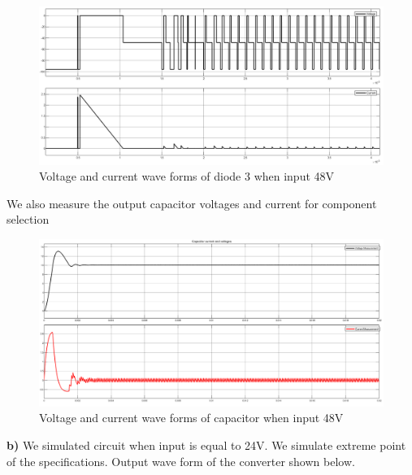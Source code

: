 \documentclass{article}
\newcommand\tab[1][1cm]{\hspace*{#1}}
\begin{document}
\begin{figure}[H]
    \centering
    \includegraphics[scale=0.3]{48diode3.png}
    \caption{Voltage and current wave forms of diode 3 when input 48V}
    \label{fig:my_label}
\end{figure}
\tab We also measure the output capacitor voltages and current for component selection
\begin{figure}[H]
    \centering
    \includegraphics[scale=0.3]{capacitor48.png}
    \caption{Voltage and current wave forms of capacitor when input 48V}
    \label{fig:my_label}
\end{figure}
\textbf{b)} We simulated circuit when input is equal to 24V.  We simulate extreme point of the specifications. Output wave form of the converter shown below.
\end{document}
